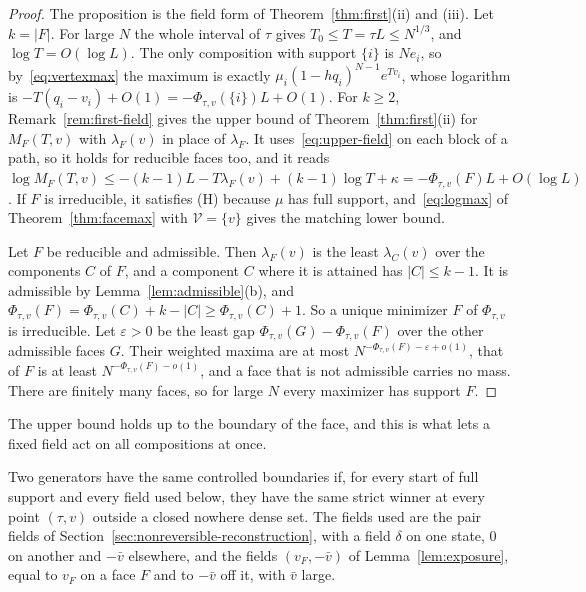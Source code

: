 \begin{proof}
The proposition is the field form of Theorem~\ref{thm:first}(ii) and (iii). Let
$k=|F|$. For large $N$ the whole interval of $\tau$ gives $T_0\le T=\tau L\le N^{1/3}$,
and $\log T=O(\log L)$. The only composition with support $\{i\}$ is $Ne_i$, so
by~\eqref{eq:vertexmax} the maximum is exactly $\mu_i(1-hq_i)^{N-1}e^{Tv_i}$, whose
logarithm is $-T(q_i-v_i)+O(1)=-\Phi_{\tau,v}(\{i\})L+O(1)$. For $k\ge2$,
Remark~\ref{rem:first-field} gives the upper bound of Theorem~\ref{thm:first}(ii)
for $M_F(T,v)$ with $\lambda_F(v)$ in place of $\lambda_F$. It uses~\eqref{eq:upper-field}
on each block of a path, so it holds for reducible faces too, and it reads
$\log M_F(T,v)\le-(k-1)L-T\lambda_F(v)+(k-1)\log T+\kappa=-\Phi_{\tau,v}(F)L+O(\log L)$.
If $F$ is irreducible, it satisfies (H) because $\mu$ has full support, and~\eqref{eq:logmax}
of Theorem~\ref{thm:facemax} with $\mathcal V=\{v\}$ gives the matching lower bound.

Let $F$ be reducible and admissible. Then $\lambda_F(v)$ is the least
$\lambda_C(v)$ over the components $C$ of $F$, and a component $C$ where it is attained has
$|C|\le k-1$. It is admissible by Lemma~\ref{lem:admissible}(b), and
$\Phi_{\tau,v}(F)=\Phi_{\tau,v}(C)+k-|C|\ge\Phi_{\tau,v}(C)+1$. So a unique minimizer $F$
of $\Phi_{\tau,v}$ is irreducible. Let $\varepsilon>0$ be the least gap
$\Phi_{\tau,v}(G)-\Phi_{\tau,v}(F)$ over the other admissible faces $G$. Their weighted
maxima are at most $N^{-\Phi_{\tau,v}(F)-\varepsilon+o(1)}$, that of $F$ is at least
$N^{-\Phi_{\tau,v}(F)-o(1)}$, and a face that is not admissible carries no mass. There are
finitely many faces, so for large $N$ every maximizer has support $F$.
\end{proof}

The upper bound holds up to the boundary of the face, and this is what lets a
fixed field act on all compositions at once.

\begin{definition}\label{def:controlled}
Two generators have the same controlled boundaries if, for every start of full
support and every field used below, they have the same strict winner at every
point $(\tau,v)$ outside a closed nowhere dense set. The fields used are the
pair fields of Section~\ref{sec:nonreversible-reconstruction}, with a field
$\delta$ on one state, $0$ on another and $-\bar v$ elsewhere, and the fields
$(v_F,-\bar v)$ of Lemma~\ref{lem:exposure}, equal to $v_F$ on a face $F$ and to
$-\bar v$ off it, with $\bar v$ large.
\end{definition}

